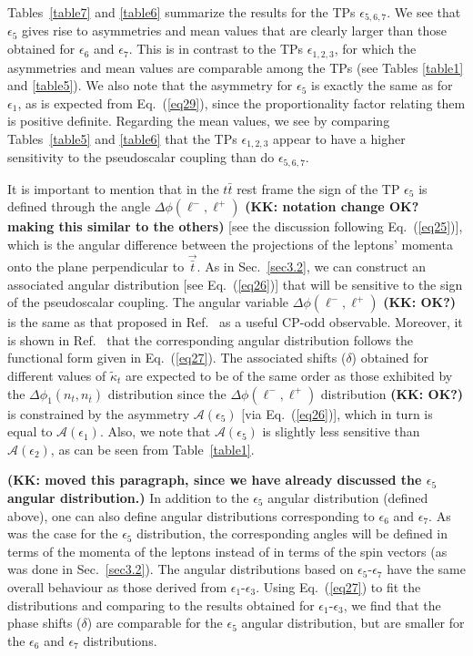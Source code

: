 \documentclass[aps,preprint,tightenlines,floatfix,superscriptaddress,nofootinbib,showpacs]{revtex4-1}
\def\tbar{\bar{t}}
\def\kpt{\tilde{\kappa}_t}
\begin{document}
Tables~\ref{table7} and
\ref{table6} summarize the results for the TPs $\epsilon_{5,6,7}$.
We see that $\epsilon_5$ gives rise to asymmetries and mean
values that are clearly larger than those obtained for $\epsilon_6$
and $\epsilon_7$. This is in contrast to the TPs $\epsilon_{1,2,3}$,
for which the asymmetries and mean values are comparable among the
TPs
(see Tables
\ref{table1} and \ref{table5}). We also note that the asymmetry for
$\epsilon_5$ is exactly the same as for $\epsilon_1$, as is expected
from Eq.~(\ref{eq29}), since the proportionality factor relating them
is positive definite. Regarding the mean values, we see by comparing
Tables~\ref{table5} and \ref{table6} that the TPs $\epsilon_{1,2,3}$
appear to have a higher sensitivity to the pseudoscalar coupling than do
$\epsilon_{5,6,7}$.  \par

It is important to mention that in the
$t\tbar$ rest frame the sign of the TP $\epsilon_5$ is defined through
the angle $\Delta\phi(\ell^-,\ell^+)$ {\bf (KK: notation change OK? making this
  similar to the others)} [see the discussion following
  Eq.~(\ref{eq25})],
which is the angular difference between the
projections of the leptons' momenta onto the plane perpendicular to
$\vec{\tbar}$.  As in Sec.~\ref{sec3.2}, we can construct an associated angular
distribution [see Eq.~(\ref{eq26})] that
will be sensitive to the sign of the pseudoscalar coupling. The
angular variable $\Delta\phi(\ell^-,\ell^+)$ {\bf (KK: OK?)}
is the same as that proposed in Ref.~\cite{Ellis} as a
useful $\mathrm{CP}$-odd observable. Moreover, it is shown in
Ref.~\cite{Ellis} that the corresponding
angular distribution follows the functional
form given in Eq.~(\ref{eq27}). The associated shifts ($\delta$)
obtained for different values of $\kpt$ are expected to be of the same
order as those exhibited by the $\Delta\phi_1(n_t,n_{\tbar})$
distribution since the $\Delta\phi(\ell^-,\ell^+)$ distribution {\bf (KK: OK?)}
is constrained by the asymmetry $\mathcal{A}(\epsilon_5)$
[via Eq.~(\ref{eq26})],
which in turn is equal to
$\mathcal{A}(\epsilon_1)$. Also, we note that $\mathcal{A}(\epsilon_5)$ is slightly less sensitive
than $\mathcal{A}(\epsilon_2)$,
as can be seen from Table~\ref{table1}.
\par

{\bf (KK: moved this paragraph, since we have already
  discussed the $\epsilon_5$ angular distribution.)}
In addition to the $\epsilon_5$ angular distribution
(defined above), one can also define angular distributions
corresponding to $\epsilon_6$ and $\epsilon_7$.  As was the case
for the $\epsilon_5$ distribution,
the corresponding angles will be defined in terms
of the momenta of the leptons instead of in terms of the spin vectors
(as was done in Sec.~\ref{sec3.2}). The
angular distributions based on $\epsilon_5$-$\epsilon_7$
have the same overall behaviour as those derived from
$\epsilon_1$-$\epsilon_3$.  Using Eq.~(\ref{eq27})
to fit the distributions and comparing to the results obtained for
$\epsilon_1$-$\epsilon_3$, we find that the phase shifts ($\delta$)
are comparable for the $\epsilon_5$ angular distribution, but are
smaller for the
$\epsilon_6$ and $\epsilon_7$ distributions.  
\par
\end{document}
